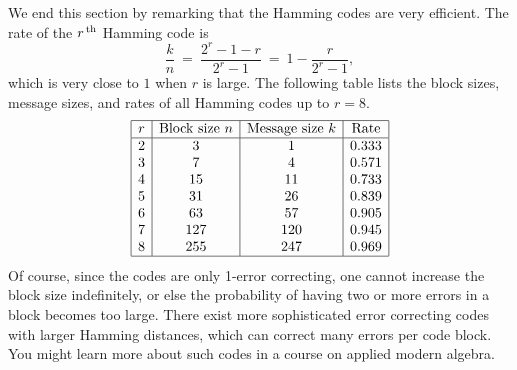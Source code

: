 We end this section by remarking that the Hamming codes are very
efficient. The rate of the $r^{\,\rm th}$ Hamming code is
\begin{equation*}
  \frac{k}{n}
  ~=~ \frac{2^r-1-r}{2^r-1}
  ~=~ 1 - \frac{r}{2^r-1},
\end{equation*}
which is very close to $1$ when $r$ is large. The following table
lists the block sizes, message sizes, and rates of all Hamming codes
up to $r=8$.
\begin{equation*}
  \begin{array}{|c|c|c|c|}
    \hline
    r & \mbox{Block size $n$} & \mbox{Message size $k$} & \mbox{Rate} \\\hline
    2  & 3    & 1    & 0.333 \\
    3  & 7    & 4    & 0.571 \\
    4  & 15   & 11   & 0.733 \\
    5  & 31   & 26   & 0.839 \\
    6  & 63   & 57   & 0.905 \\
    7  & 127  & 120  & 0.945 \\
    8  & 255  & 247  & 0.969 \\
    \hline
  \end{array}
\end{equation*}
Of course, since the codes are only 1-error correcting, one cannot
increase the block size indefinitely, or else the probability of
having two or more errors in a block becomes too large. There exist
more sophisticated error correcting codes with larger Hamming
distances, which can correct many errors per code block. You might
learn more about such codes in a course on applied modern algebra.
